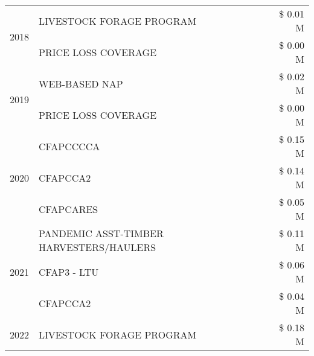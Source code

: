 \begin{tabular}{llr}
\cline{1-3}
\multirow[t]{2}{*}{2018} & LIVESTOCK FORAGE PROGRAM & \$ 0.01 M \\
 & PRICE LOSS COVERAGE & \$ 0.00 M \\
\cline{1-3}
\multirow[t]{2}{*}{2019} & WEB-BASED NAP & \$ 0.02 M \\
 & PRICE LOSS COVERAGE & \$ 0.00 M \\
\cline{1-3}
\multirow[t]{3}{*}{2020} & CFAPCCCCA & \$ 0.15 M \\
 & CFAPCCA2 & \$ 0.14 M \\
 & CFAPCARES & \$ 0.05 M \\
\cline{1-3}
\multirow[t]{3}{*}{2021} & PANDEMIC ASST-TIMBER HARVESTERS/HAULERS & \$ 0.11 M \\
 & CFAP3 - LTU & \$ 0.06 M \\
 & CFAPCCA2 & \$ 0.04 M \\
\cline{1-3}
2022 & LIVESTOCK FORAGE PROGRAM & \$ 0.18 M \\
\cline{1-3}
\bottomrule
\end{tabular}
